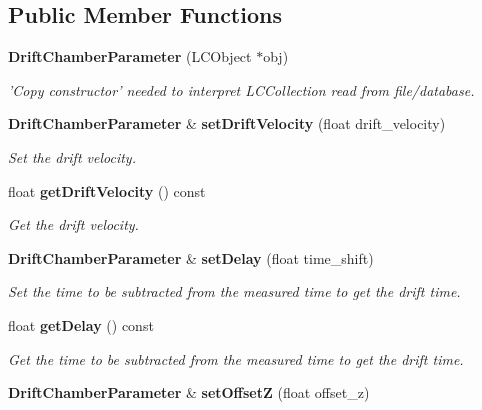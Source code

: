 \subsection*{Public Member Functions}
\begin{DoxyCompactItemize}
\item 
{\bf Drift\-Chamber\-Parameter} (L\-C\-Object $\ast$obj)\label{classCALICE_1_1DriftChamberParameter_ac3f7e30c5f70454126342fe3e192c1be}

\begin{DoxyCompactList}\small\item\em 'Copy constructor' needed to interpret L\-C\-Collection read from file/database. \end{DoxyCompactList}\item 
{\bf Drift\-Chamber\-Parameter} \& {\bf set\-Drift\-Velocity} (float drift\-\_\-velocity)\label{classCALICE_1_1DriftChamberParameter_a72ca0c60cfa34e730a99b8ebb557021f}

\begin{DoxyCompactList}\small\item\em Set the drift velocity. \end{DoxyCompactList}\item 
float {\bf get\-Drift\-Velocity} () const \label{classCALICE_1_1DriftChamberParameter_a478ffb65ebfcdba16139529f2f19ec72}

\begin{DoxyCompactList}\small\item\em Get the drift velocity. \end{DoxyCompactList}\item 
{\bf Drift\-Chamber\-Parameter} \& {\bf set\-Delay} (float time\-\_\-shift)\label{classCALICE_1_1DriftChamberParameter_a6a0f492d3b1cb14da314e777fd5796c9}

\begin{DoxyCompactList}\small\item\em Set the time to be subtracted from the measured time to get the drift time. \end{DoxyCompactList}\item 
float {\bf get\-Delay} () const \label{classCALICE_1_1DriftChamberParameter_af6f6db7b63df194db0ada6c041a3da79}

\begin{DoxyCompactList}\small\item\em Get the time to be subtracted from the measured time to get the drift time. \end{DoxyCompactList}\item 
{\bf Drift\-Chamber\-Parameter} \& {\bf set\-Offset\-Z} (float offset\-\_\-z)\label{classCALICE_1_1DriftChamberParameter_a0e43cdb564cb5929fd6785e684c83e85}


\end{DoxyCompactItemize}
